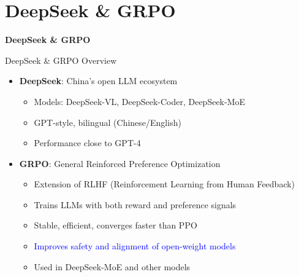 \section{DeepSeek \& GRPO}
\begin{frame}{}
    \LARGE \textbf{DeepSeek \& GRPO}
\end{frame}

\begin{frame}{DeepSeek \& GRPO Overview}
    \begin{itemize}
        \item \textbf{DeepSeek}: China's open LLM ecosystem
        \begin{itemize}
            \item Models: DeepSeek-VL, DeepSeek-Coder, DeepSeek-MoE
            \item GPT-style, bilingual (Chinese/English)
            \item Performance close to GPT-4
        \end{itemize}
        \item \textbf{GRPO}: General Reinforced Preference Optimization
        \begin{itemize}
            \item Extension of RLHF (Reinforcement Learning from Human Feedback)
            \item Trains LLMs with both reward and preference signals
            \item Stable, efficient, converges faster than PPO
            \item \textcolor{blue}{Improves safety and alignment of open-weight models}
            \item Used in DeepSeek-MoE and other models
        \end{itemize}
    \end{itemize}
\end{frame}

